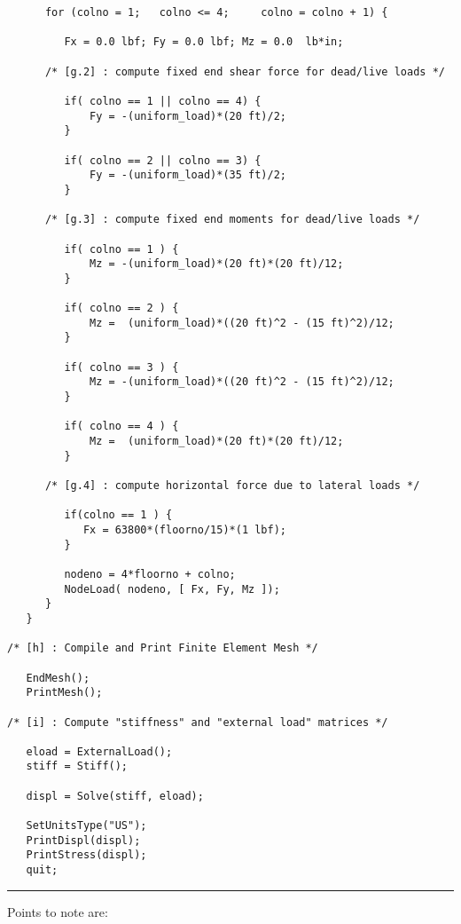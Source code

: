\begin{footnotesize}
\begin{verbatim}
      for (colno = 1;   colno <= 4;     colno = colno + 1) {

         Fx = 0.0 lbf; Fy = 0.0 lbf; Mz = 0.0  lb*in;

      /* [g.2] : compute fixed end shear force for dead/live loads */

         if( colno == 1 || colno == 4) {
             Fy = -(uniform_load)*(20 ft)/2;
         }

         if( colno == 2 || colno == 3) {
             Fy = -(uniform_load)*(35 ft)/2;
         }

      /* [g.3] : compute fixed end moments for dead/live loads */

         if( colno == 1 ) {
             Mz = -(uniform_load)*(20 ft)*(20 ft)/12;
         }

         if( colno == 2 ) {
             Mz =  (uniform_load)*((20 ft)^2 - (15 ft)^2)/12;
         }

         if( colno == 3 ) {
             Mz = -(uniform_load)*((20 ft)^2 - (15 ft)^2)/12;
         }

         if( colno == 4 ) {
             Mz =  (uniform_load)*(20 ft)*(20 ft)/12;
         }

      /* [g.4] : compute horizontal force due to lateral loads */

         if(colno == 1 ) {
            Fx = 63800*(floorno/15)*(1 lbf);
         }

         nodeno = 4*floorno + colno;
         NodeLoad( nodeno, [ Fx, Fy, Mz ]); 
      }
   }

/* [h] : Compile and Print Finite Element Mesh */

   EndMesh();
   PrintMesh();

/* [i] : Compute "stiffness" and "external load" matrices */

   eload = ExternalLoad();
   stiff = Stiff();

   displ = Solve(stiff, eload);

   SetUnitsType("US");
   PrintDispl(displ);
   PrintStress(displ); 
   quit;
\end{verbatim}
\rule{6.25 in}{0.035 in}
\end{footnotesize}

\vspace{0.15 in}\noindent
Points to note are:

